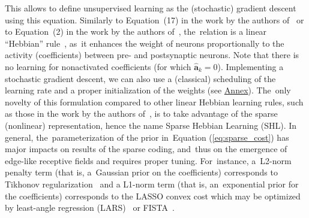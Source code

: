 \documentclass[vision,article,accept,oneauthor,pdftex]{Definitions/mdpi}
\newcommand{\coef}{\mathbf{a}} %
\newcommand{\image}{\mathbf{y}} %
\begin{document}
This allows to define unsupervised learning as the (stochastic) gradient descent using this equation. Similarly to Equation~(17) in the work by the authors of~\citep{Olshausen97} or to Equation~(2) in the work by the authors of~\citep{Smith06}, the~relation is a linear ``Hebbian'' rule~\citep{Hebb49}, as~it enhances the weight of neurons proportionally to the activity (coefficients) between pre- and postsynaptic neurons. Note that there is no learning for nonactivated coefficients (for which $\hat{\coef}_{k}=0$). Implementing a stochastic gradient descent, we can also use a (classical) scheduling of the learning rate and a proper initialization of the weights (see \href{https://spikeai.github.io/HULK/#Testing-two-different-dictionary-initalization-strategies}{Annex}). The~only novelty of this formulation compared to other linear Hebbian learning rules, such as those in the work by the authors of~\citep{Oja82}, is to take advantage of the sparse (nonlinear) representation, hence the name Sparse Hebbian Learning (SHL).
In general, the~parameterization of the prior in~Equation (\ref{eq:sparse_cost}) has major impacts on results of the sparse coding, and~thus on the emergence of edge-like receptive fields and requires proper tuning. For~instance, a~L2-norm penalty term (that is, a~Gaussian prior on the coefficients) corresponds to Tikhonov regularization~\citep{Tikhonov77} and a L1-norm term (that is, an~exponential prior for the coefficients) corresponds to the LASSO convex cost which may be optimized by least-angle regression (LARS)~\citep{efron2004least} or FISTA~\citep{beck2009fast}. %
\end{document}

